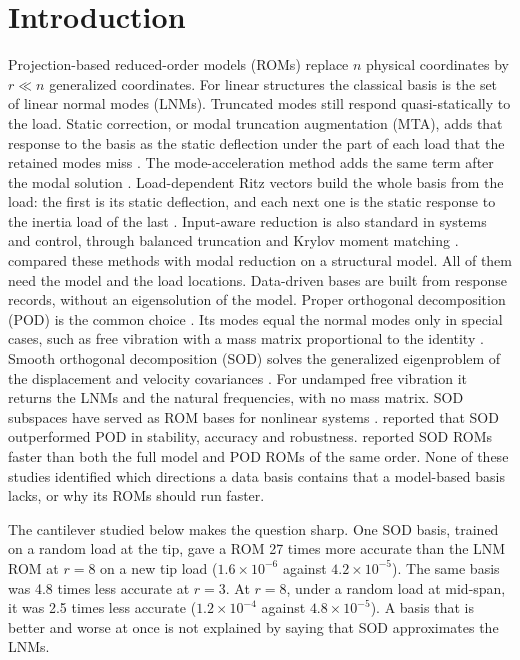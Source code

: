 \documentclass[preprint,12pt]{elsarticle}
\begin{document}
\section{Introduction}\label{sec:intro}
Projection-based reduced-order models (ROMs) replace $n$ physical coordinates by $r\ll n$ generalized coordinates.
For linear structures the classical basis is the set of linear normal modes (LNMs).
Truncated modes still respond quasi-statically to the load. Static correction, or modal truncation augmentation (MTA), adds that response to the basis as the static deflection under the part of each load that the retained modes miss \citep{Dickens1997}. The mode-acceleration method adds the same term after the modal solution \citep{Cornwell1983}.
Load-dependent Ritz vectors build the whole basis from the load: the first is its static deflection, and each next one is the static response to the inertia load of the last \citep{Wilson1982}.
Input-aware reduction is also standard in systems and control, through balanced truncation \citep{Moore1981} and Krylov moment matching \citep{Bai2002}. \citet{Besselink2013} compared these methods with modal reduction on a structural model.
All of them need the model and the load locations.
Data-driven bases are built from response records, without an eigensolution of the model. Proper orthogonal decomposition (POD) is the common choice \citep{Kerschen2005}. Its modes equal the normal modes only in special cases, such as free vibration with a mass matrix proportional to the identity \citep{Feeny1998}.
Smooth orthogonal decomposition (SOD) solves the generalized eigenproblem of the displacement and velocity covariances \citep{Chelidze2006,Farooq2008}. For undamped free vibration it returns the LNMs and the natural frequencies, with no mass matrix.
SOD subspaces have served as ROM bases for nonlinear systems \citep{Segala2015,Ilbeigi2017,Ilbeigi2018}.
\citet{Ilbeigi2017} reported that SOD outperformed POD in stability, accuracy and robustness. \citet{Ilbeigi2018} reported SOD ROMs faster than both the full model and POD ROMs of the same order.
None of these studies identified which directions a data basis contains that a model-based basis lacks, or why its ROMs should run faster.

The cantilever studied below makes the question sharp.
One SOD basis, trained on a random load at the tip, gave a ROM 27 times more accurate than the LNM ROM at $r=8$ on a new tip load ($1.6\times10^{-6}$ against $4.2\times10^{-5}$).
The same basis was 4.8 times less accurate at $r=3$. At $r=8$, under a random load at mid-span, it was 2.5 times less accurate ($1.2\times10^{-4}$ against $4.8\times10^{-5}$).
A basis that is better and worse at once is not explained by saying that SOD approximates the LNMs.
\end{document}
